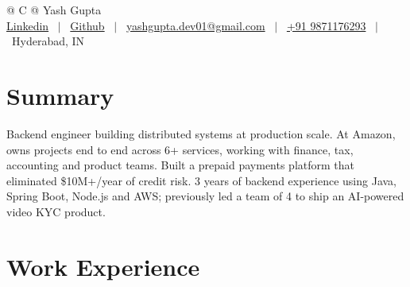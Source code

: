 \documentclass[a4paper,10.5pt]{article}
\begin{document}
\pagestyle{empty} 

\begin{tabularx}{\linewidth}{@{} C @{}}
\Huge{Yash Gupta} \\[7.5pt]
\href{https://www.linkedin.com/in/yash-gupta1/}{Linkedin} \ $|$ \ 
\href{https://github.com/yash-gupta01}{Github} \ $|$ \ 
\href{mailto:yashgupta.dev01@gmail.com}{yashgupta.dev01@gmail.com} \ $|$ \ 
\href{tel:+919871176293}{+91 9871176293} \ $|$ \
Hyderabad, IN \\
\end{tabularx}

\section{Summary}
Backend engineer building distributed systems at production scale. At Amazon, owns projects end to end across 6+ services, working with finance, tax, accounting and product teams. Built a prepaid payments platform that eliminated {\$10M+/year} of credit risk. 3 years of backend experience using Java, Spring Boot, Node.js and AWS; previously led a team of 4 to ship an AI-powered video KYC product.
\section{Work Experience}
\end{document}
